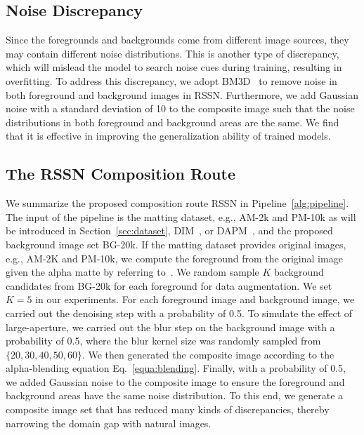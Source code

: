 \documentclass[twocolumn]{svjour3}
\begin{document}
\subsection{Noise Discrepancy}

Since the foregrounds and backgrounds come from different image sources, they may contain different noise distributions. This is another type of discrepancy, which will mislead the model to search noise cues during training, resulting in overfitting. To address this discrepancy, we adopt BM3D~\citep{dabov2009bm3d} to remove noise in both foreground and background images in RSSN. Furthermore, we add Gaussian noise with a standard deviation of 10 to the composite image such that the noise distributions in both foreground and background areas are the same. We find that it is effective in improving the generalization ability of trained models.

\subsection{The RSSN Composition Route}
\label{subsec:compositionroute}
We summarize the proposed composition route RSSN in Pipeline~\ref{alg:pipeline}. The input of the pipeline is the matting dataset, e.g., AM-2k and PM-10k as will be introduced in Section~\ref{sec:dataset}, DIM~\citep{xu2017deep}, or DAPM~\citep{shen2016deep}, and the proposed background image set BG-20k. If the matting dataset provides original images, e.g., AM-2K and PM-10k, we compute the foreground from the original image given the alpha matte by referring to~\citep{levin2007closed}. We random sample $K$ background candidates from BG-20k for each foreground for data augmentation. We set $K=5$ in our experiments. For each foreground image and background image, we carried out the denoising step with a probability of 0.5. To simulate the effect of large-aperture, we carried out the blur step on the background image with a probability of 0.5, where the blur kernel size was randomly sampled from $\{20,30,40,50,60\}$. We then generated the composite image according to the alpha-blending equation Eq.~\eqref{equa:blending}. Finally, with a probability of 0.5, we added Gaussian noise to the composite image to ensure the foreground and background areas have the same noise distribution. To this end, we generate a composite image set that has reduced many kinds of discrepancies, thereby narrowing the domain gap with natural images.
\end{document}
